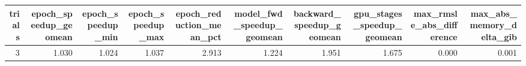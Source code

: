 \begin{tabular}{rrrrrrrrrr}
\toprule
trials & epoch\_speedup\_geomean & epoch\_speedup\_min & epoch\_speedup\_max & epoch\_reduction\_mean\_pct & model\_fwd\_speedup\_geomean & backward\_speedup\_geomean & gpu\_stages\_speedup\_geomean & max\_rmsle\_abs\_difference & max\_abs\_memory\_delta\_gib \\
\midrule
3 & 1.030 & 1.024 & 1.037 & 2.913 & 1.224 & 1.951 & 1.675 & 0.000 & 0.001 \\
\bottomrule
\end{tabular}

